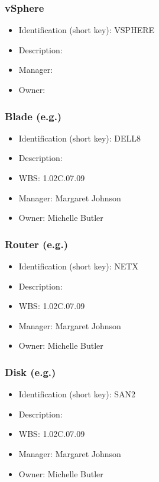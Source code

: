 \subsubsection{vSphere}\label{sect:VSPHERE}
\begin{itemize}
\item Identification (short key): VSPHERE
\item Description: 
\item Manager: 
\item Owner: 
\end{itemize}

\subsubsection{Blade (e.g.)}\label{sect:DELL8}
\begin{itemize}
\item Identification (short key): DELL8
\item Description: 
\item WBS: 1.02C.07.09
\item Manager: Margaret Johnson
\item Owner: Michelle Butler
\end{itemize}

\subsubsection{Router (e.g.)}\label{sect:NETX}
\begin{itemize}
\item Identification (short key): NETX
\item Description: 
\item WBS: 1.02C.07.09
\item Manager: Margaret Johnson
\item Owner: Michelle Butler
\end{itemize}

\subsubsection{Disk (e.g.)}\label{sect:SAN2}
\begin{itemize}
\item Identification (short key): SAN2
\item Description: 
\item WBS: 1.02C.07.09
\item Manager: Margaret Johnson
\item Owner: Michelle Butler
\end{itemize}

